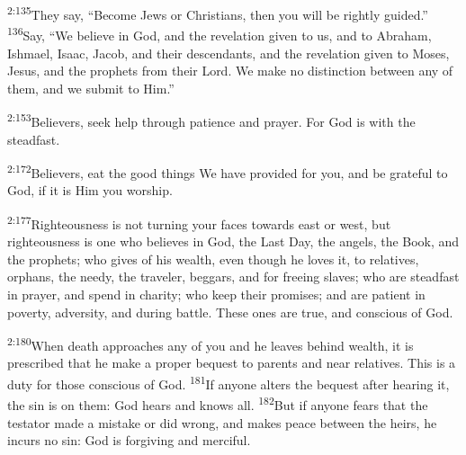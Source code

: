 \documentclass[openany,12pt,english]{book}
\newenvironment{para}{\par\pretolerance=100\tolerance=200\setlength{\emergencystretch}{0.6em}\relax}{\par}
\begin{document}
\begin{para}
    \textsuperscript{2:135}\thinspace{}They say, “Be\-come Jews or Christians, then you will be right\-ly guid\-ed.”
    \textsuperscript{136}\thinspace{}Say, “We be\-lieve in God, and the rev\-e\-la\-tion giv\-en to us, and to Abraham, Ishmael, Isaac, Jacob, and their descendants, and the rev\-e\-la\-tion giv\-en to Mo\-ses, Jesus, and the prophets from their Lord. We make no dis\-tinc\-tion be\-tween any of them, and we sub\-mit to Him.”
\end{para}

\begin{para}
    \textsuperscript{2:153}\thinspace{}Believers, seek help through pa\-tience and pray\-er. For God is with the stead\-fast.
\end{para}

\begin{para}
    \textsuperscript{2:172}\thinspace{}Believers, eat the good things We have pro\-vid\-ed for you, and be grate\-ful to God, if it is Him you wor\-ship.
\end{para}

\begin{para}
    \textsuperscript{2:177}\thinspace{}Right\-eous\-ness is not turn\-ing your faces to\-wards east or west, but right\-eous\-ness is one who believes in God, the Last Day, the angels, the Book, and the prophets; who gives of his wealth, e\-ven though he loves it, to relatives, orphans, the needy, the trav\-el\-er, beggars, and for free\-ing slaves; who are stead\-fast in pray\-er, and spend in char\-i\-ty; who keep their promises; and are pa\-tient in pov\-er\-ty, ad\-ver\-si\-ty, and dur\-ing bat\-tle. These ones are true, and con\-scious of God.
\end{para}

\begin{para}
    \textsuperscript{2:180}\thinspace{}When death approaches any of you and he leaves be\-hind wealth, it is pre\-scribed that he make a prop\-er be\-quest to parents and near relatives. This is a du\-ty for those con\-scious of God.
    \textsuperscript{181}\thinspace{}If any\-one alters the be\-quest af\-ter hear\-ing it, the sin is on them: God hears and knows all.
    \textsuperscript{182}\thinspace{}But if any\-one fears that the tes\-ta\-tor made a mis\-take or did wrong, and makes peace be\-tween the heirs, he incurs no sin: God is for\-giv\-ing and mer\-ci\-ful.
\end{para}
\end{document}
